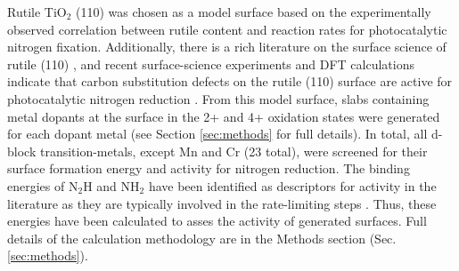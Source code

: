 Rutile TiO$_2$ (110) was chosen as a model surface based on the experimentally observed correlation between rutile content and reaction rates for photocatalytic nitrogen fixation\cite{Schrauzer_1977}. Additionally, there is a rich literature on the surface science of rutile (110) \cite{Diebold_2003, Yates_1991, Lu1994, Walle2009}, and recent surface-science experiments and DFT calculations indicate that carbon substitution defects on the rutile (110) surface are active for photocatalytic nitrogen reduction \cite{Comer_2018b}. From this model surface, slabs containing metal dopants at the surface in the 2+ and 4+ oxidation states were generated for each dopant metal (see Section \ref{sec:methods} for full details).
In total, all d-block transition-metals, except Mn and Cr (23 total), were screened for their surface formation energy and activity for nitrogen reduction.  The binding energies of N$_2$H and NH$_2$ have been identified as descriptors for activity in the literature as they are typically involved in the rate-limiting steps \cite{Hoskuldsson_2017, Montoya_2015, Comer_2018}. Thus, these energies have been calculated to asses the activity of generated surfaces.  Full details of the calculation methodology are in the Methods section (Sec. \ref{sec:methods}).


